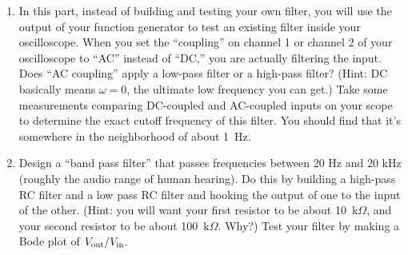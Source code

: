 \begin{enumerate}[wide]
\item In this part, instead of building and testing your own filter, you will use the output of your function generator to test an existing filter inside your oscilloscope.  When you set the ``coupling'' on channel 1 or channel 2 of your oscilloscope to ``AC'' instead of ``DC,'' you are actually filtering the input.  Does ``AC coupling'' apply a low-pass filter or a high-pass filter?  (Hint: DC basically means $\omega=0$, the ultimate low frequency you can get.) Take some measurements comparing DC-coupled and AC-coupled inputs on your scope to determine the exact cutoff frequency of this filter.  You should find that it's somewhere in the neighborhood of about 1~Hz.

\item Design a ``band pass filter'' that passes frequencies between 20 Hz and 20 kHz (roughly the audio range of human hearing).  Do this by building a high-pass RC filter and a low pass RC filter and hooking the output of one to the input of the other.  (Hint: you will want your first resistor to be about 10~k$\Omega$, and your second resistor to be about 100~k$\Omega$.  Why?)   Test your filter by making a Bode plot of $V_{\rm out}/V_{\rm in}$.\label{part_band_pass_filter}




\end{enumerate}
